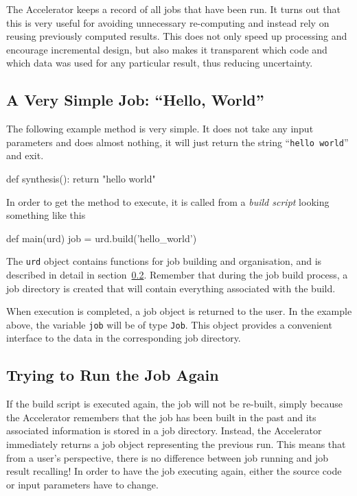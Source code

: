 The Accelerator keeps a record of all jobs that have been run.  It
turns out that this is very useful for avoiding unnecessary
re-computing and instead rely on reusing previously computed results.
This does not only speed up processing and encourage incremental
design, but also makes it transparent which code and which data was
used for any particular result, thus reducing uncertainty.




\subsection{A Very Simple Job:  ``Hello, World''}

The following example method is very simple.  It does not take any
input parameters and does almost nothing, it will just return the
string ``\texttt{hello world}'' and exit.
\begin{python}
def synthesis():
    return "hello world"
\end{python}
In order to get the method to execute, it is called from a
\textsl{build script} looking something like this
\begin{python}
def main(urd)
    job = urd.build('hello_world')
\end{python}
The \texttt{urd} object contains functions for job building and
organisation, and is described in detail in section~\ref{}.  Remember
that during the job build process, a job directory is created that
will contain everything associated with the build.

When execution is completed, a job object is returned to the user.  In
the example above, the variable \texttt{job} will be of type
\texttt{Job}.  This object provides a convenient interface to the data
in the corresponding job directory.



\subsection{Trying to Run the Job Again}
If the build script is executed again, the job will not be re-built,
simply because the Accelerator remembers that the job has been built
in the past and its associated information is stored in a job
directory.  Instead, the Accelerator immediately returns a job object
representing the previous run.  This means that from a user's
perspective, there is no difference between job running and job result
recalling!  In order to have the job executing again, either the
source code or input parameters have to change.



